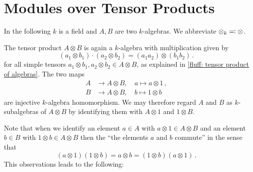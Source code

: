 \section{Modules over Tensor Products}


\begin{conventions}
  In the following $k$ is a field and $A, B$ are two $k$-algebras.
  We abbreviate $\otimes_k \eqqcolon \otimes$.
\end{conventions}


\begin{fluff}
  The tensor product $A \otimes B$ is again a $k$-algebra with multiplication given by
  \[
      (a_1 \otimes b_1) \cdot (a_2 \otimes b_2)
    = (a_1 a_2) \otimes (b_1 b_2) \,.
  \]
  for all simple tensors $a_1 \otimes b_1, a_2 \otimes b_2 \in A \otimes B$, as explained in \ref{fluff: tensor product of algebras}.
  The two maps
  \begin{align*}
              A
      &\to    A \otimes B,
      \quad   a
      \mapsto a \otimes 1 \,,
  \\
              B
      &\to    A \otimes B,
      \quad   b
      \mapsto 1 \otimes b
  \end{align*}
  are injective $k$-algebra homomorphism.
  We may therefore regard $A$ and $B$ as $k$-subalgebras of $A \otimes B$ by identifying them with $A \otimes 1$ and $1 \otimes B$.
  
  Note that when we identify an element $a \in A$ with $a \otimes 1 \in A \otimes B$ and an element $b \in B$ with $1 \otimes b \in A \otimes B$ then the \enquote{the elements $a$ and $b$ commute} in the sense that
  \[
      (a \otimes 1)(1 \otimes b)
    = a \otimes b
    = (1 \otimes b)(a \otimes 1) \,.
  \]
  This observations leads to the following:
\end{fluff}


